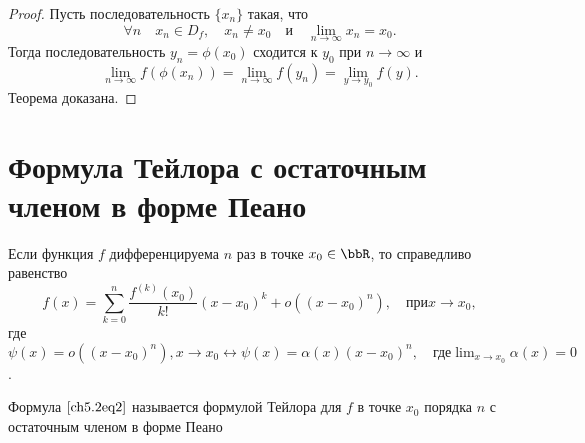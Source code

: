 \begin{proof}
Пусть последовательность $\{ x_n \}$ такая, что 
$$
\forall n \quad x_n \in D_f, \quad x_n \not= x_0 \quad \text{и} \quad \lim_{n \to \infty} x_n = x_0.
$$
Тогда последовательность $y_n = \phi(x_0)$ сходится к $y_0$ при $n \to \infty$ и 
$$
\lim_{n \to \infty} f(\phi(x_n)) = \lim_{n \to \infty} f(y_n) = \lim_{y \to y_0} f(y).
$$
Теорема доказана.
\end{proof}

\section{Формула Тейлора с остаточным членом в форме Пеано}

\begin{thm}
Если функция $f$ дифференцируема $n$ раз в точке $x_0 \in \bbR$, то справедливо равенство
\begin{equation} \label{ch5.2eq2}
f(x) = \sum_{k = 0}^{n} \frac{f^{(k)}(x_0)}{k!} (x - x_0)^k + o((x - x_0)^n), \quad при x \to x_0,
\end{equation}
где $\psi(x) = o((x - x_0)^n), x \to x_0 \leftrightarrow \psi(x) = \alpha(x) (x - x_0)^n, \quad \text{где} \lim_{x \to x_0} \alpha(x) = 0$.

Формула $\eqref{ch5.2eq2}$ называется формулой Тейлора для $f$ в точке $x_0$ порядка $n$ с остаточным членом в форме Пеано
\end{thm}

